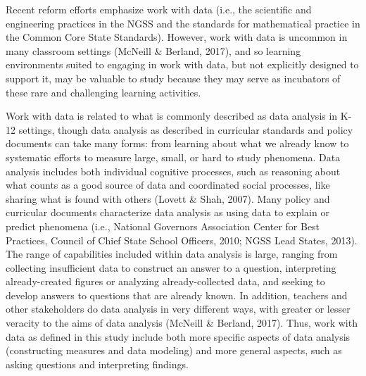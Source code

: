 \documentclass[]{msu-thesis}
\theoremstyle{definition}
\theoremstyle{definition}
\theoremstyle{definition}
\theoremstyle{remark}
\begin{document}
Recent reform efforts emphasize work with data (i.e., the scientific and
engineering practices in the NGSS and the standards for mathematical
practice in the Common Core State Standards). However, work with data is
uncommon in many classroom settings (McNeill \& Berland, 2017), and so
learning environments suited to engaging in work with data, but not
explicitly designed to support it, may be valuable to study because they
may serve as incubators of these rare and challenging learning
activities.

Work with data is related to what is commonly described as data analysis
in K-12 settings, though data analysis as described in curricular
standards and policy documents can take many forms: from learning about
what we already know to systematic efforts to measure large, small, or
hard to study phenomena. Data analysis includes both individual
cognitive processes, such as reasoning about what counts as a good
source of data and coordinated social processes, like sharing what is
found with others (Lovett \& Shah, 2007). Many policy and curricular
documents characterize data analysis as using data to explain or predict
phenomena (i.e., National Governors Association Center for Best
Practices, Council of Chief State School Officers, 2010; NGSS Lead
States, 2013). The range of capabilities included within data analysis
is large, ranging from collecting insufficient data to construct an
answer to a question, interpreting already-created figures or analyzing
already-collected data, and seeking to develop answers to questions that
are already known. In addition, teachers and other stakeholders do data
analysis in very different ways, with greater or lesser veracity to the
aims of data analysis (McNeill \& Berland, 2017). Thus, work with data
as defined in this study include both more specific aspects of data
analysis (constructing measures and data modeling) and more general
aspects, such as asking questions and interpreting findings.
\end{document}
